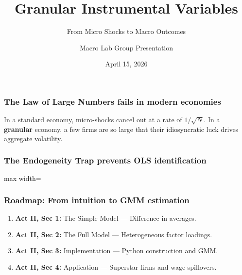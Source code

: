 \documentclass[aspectratio=169,11pt]{beamer}
\begin{document}
\begin{frame}[plain]
    \title{Granular Instrumental Variables}
    \subtitle{From Micro Shocks to Macro Outcomes}
    \author{Macro Lab Group Presentation}
    \date{April 15, 2026}
    \titlepage
\end{frame}


\begin{frame}
\frametitle{The Law of Large Numbers fails in modern economies}
\vspace{1cm}
{\Large
In a standard economy, micro-shocks cancel out at a rate of $1/\sqrt{N}$.
}
\vspace{1cm}
{\Large
In a \textbf{granular} economy, a few firms are so large that their idiosyncratic luck drives aggregate volatility.
}
\end{frame}

\begin{frame}
\frametitle{The Endogeneity Trap prevents OLS identification}
\vspace{0.5cm}
\begin{center}
\begin{adjustbox}{max width=\textwidth}
\end{adjustbox}
\end{center}
\end{frame}

\begin{frame}
\frametitle{Roadmap: From intuition to GMM estimation}
\vspace{0.8cm}
\begin{enumerate}
    \item \textbf{Act II, Sec 1:} The Simple Model — Difference-in-averages.
    \item \textbf{Act II, Sec 2:} The Full Model — Heterogeneous factor loadings.
    \item \textbf{Act II, Sec 3:} Implementation — Python construction and GMM.
    \item \textbf{Act II, Sec 4:} Application — Superstar firms and wage spillovers.
\end{enumerate}
\end{frame}
\end{document}
